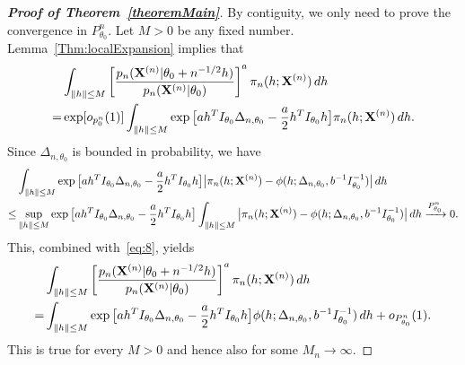 \documentclass[11pt]{article}
\theoremstyle{plain}
\theoremstyle{definition}
\theoremstyle{remark}
\begin{document}
\begin{appendices}
\begin{proof}[\textbf{Proof of Theorem~\ref{theoremMain}}]
    By contiguity, we only need to prove the convergence in $P_{\theta_0}^n$.
    Let $M>0$ be any fixed number.
Lemma~\ref{Thm:localExpansion} implies that
\begin{equation}\label{eq:8}
    \begin{split}
    &\int_{\|h\|\leq M} \left[\frac{p_n(\mathbf{X}^{(n)}|\theta_0+n^{-1/2}h)}{p_n(\mathbf{X}^{(n)}|\theta_0)}\right]^a \pi_n (h;\mathbf{X}^{(n)}) \, dh\\
    =&
    \exp [o_{p^n_0}(1)]\int_{\|h\|\leq M} \exp\big[ a h^T I_{\theta_0}\Delta_{n,\theta_0}- \frac{a}{2}h^T I_{\theta_0}h\big]\pi_n (h;\mathbf{X}^{(n)}) \, dh.
\end{split}
\end{equation}
Since $\Delta_{n,\theta_0}$ is bounded in probability, we have
\begin{equation*}
\begin{aligned}
    &\int_{\|h\|\leq M} \exp\big[a h^T I_{\theta_0}\Delta_{n,\theta_0}-\frac{a}{2}h^T I_{\theta_0}h\big] \big|\pi_n (h;\mathbf{X}^{(n)})-\phi(h;\Delta_{n,\theta_0},b^{-1} I_{\theta_0}^{-1})\big|\, dh
\\
    \leq& \sup_{\|h\|\leq M}\exp\big[a h^T I_{\theta_0}\Delta_{n,\theta_0}-\frac{a}{2}h^T I_{\theta_0}h\big] 
    \int_{\|h\|\leq M}
    \big|\pi_n (h;\mathbf{X}^{(n)})-\phi(h;\Delta_{n,\theta_0}, b^{-1} I_{\theta_0}^{-1})\big|\, dh
    \xrightarrow{P^n_{\theta_0}}0.
\end{aligned}
\end{equation*}
This, combined with~\eqref{eq:8}, yields 
\begin{equation}\label{eq:14}
    \begin{split}
    &\int_{\|h\|\leq M} \left[ \frac{p_n(\mathbf{X}^{(n)}|\theta_0+n^{-1/2}h)}{p_n(\mathbf{X}^{(n)}|\theta_0)}\right]^a \pi_n (h;\mathbf{X}^{(n)}) \, dh
    \\
    =&\int_{\|h\|\leq M} \exp\big[ a h^T I_{\theta_0}\Delta_{n,\theta_0}-\frac{a}{2}h^T I_{\theta_0}h\big] \phi(h;\Delta_{n,\theta_0}, b^{-1} I_{\theta_0}^{-1})\, dh
    +o_{P^n_{\theta_0}}(1).
\end{split}
\end{equation}
This is true for every $M>0$ and hence also for some $M_n\to \infty$.


\end{proof}
\end{appendices}
\end{document}
